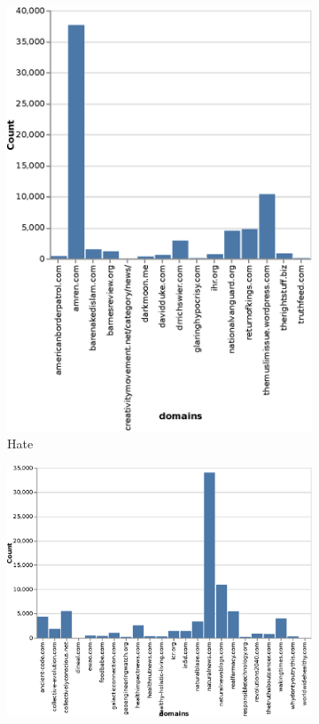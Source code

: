 \begin{figure}[h]
\begin{subfigure}[b]{0.3\textwidth}
         \includegraphics[width=\textwidth,height=0.3\textheight]{chapter/images/data_exploration/hate.eps}
         \caption{Hate}
     \end{subfigure}
     \hfill
     \begin{subfigure}[b]{0.3\textwidth}
         \centering
         \includegraphics[width=\textwidth,height=0.3\textheight]{chapter/images/data_exploration/junksci.eps}

\end{subfigure}
\end{figure}
